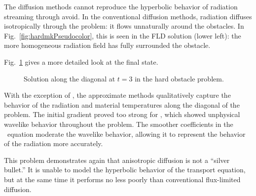 The diffusion methods cannot reproduce the hyperbolic behavior of radiation
streaming through avoid. In the conventional diffusion methods, radiation
diffuses isotropically through the problem: it flows unnaturally around the
obstacles. In Fig.~\ref{fig:hardmkPseudocolor}, this is seen in the FLD solution
(lower left): the more homogeneous radiation field has fully surrounded the
obstacle.

Fig.~\ref{fig:hardmkDiag} gives a more detailed look at the final state.
%
\begin{figure}[htb]
  \centering
  \caption{Solution along the diagonal at $t=3$ in the hard obstacle problem.}
  \label{fig:hardmkDiag}
\end{figure}
%
With the exception of \Pone, the approximate methods qualitatively
capture the behavior of the radiation and material temperatures along the
diagonal of the problem. The initial gradient proved too strong for \Pone, which
showed unphysical wavelike behavior throughout the problem. The smoother
coefficients in the \APone\ equation moderate the wavelike behavior, allowing it
to represent the behavior of the radiation more accurately.

This problem demonstrates again that anisotropic diffusion is not a ``silver
bullet.'' It is unable to model the hyperbolic behavior of the transport equation,
but at the same time it performs no less poorly than conventional flux-limited
diffusion.

%  

